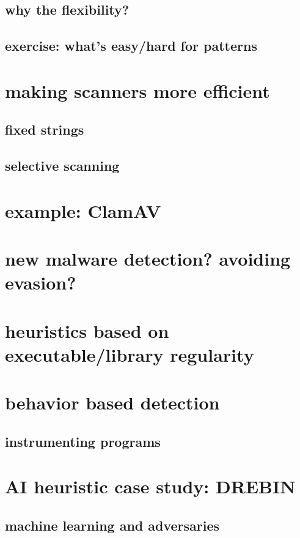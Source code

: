 \subsection{why the flexibility?}

\subsection{exercise: what's easy/hard for patterns}


\section{making scanners more efficient}


\subsection{fixed strings}


\subsection{selective scanning}


\section{example: ClamAV}


\section{new malware detection? avoiding evasion?}


\section{heuristics based on executable/library regularity}


\section{behavior based detection}


\subsection{instrumenting programs}


\section{AI heuristic case study: DREBIN}


\subsection{machine learning and adversaries}



